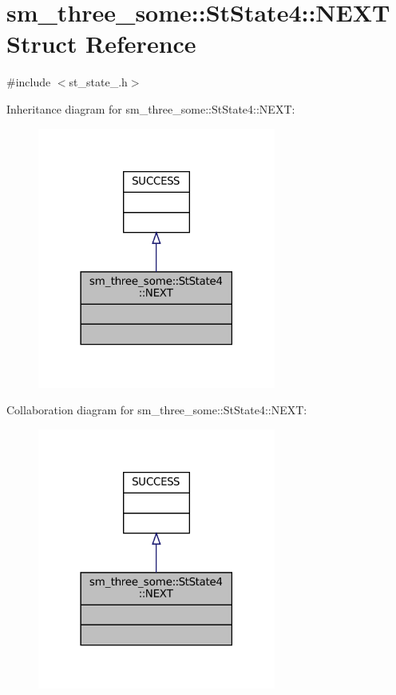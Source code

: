 \hypertarget{structsm__three__some_1_1StState4_1_1NEXT}{}\section{sm\+\_\+three\+\_\+some\+:\+:St\+State4\+:\+:N\+E\+XT Struct Reference}
\label{structsm__three__some_1_1StState4_1_1NEXT}


{\ttfamily \#include $<$st\+\_\+state\+\_.\+h$>$}



Inheritance diagram for sm\+\_\+three\+\_\+some\+:\+:St\+State4\+:\+:N\+E\+XT\+:
\nopagebreak
\begin{figure}[H]
\begin{center}
\leavevmode
\includegraphics[width=222pt]{structsm__three__some_1_1StState4_1_1NEXT__inherit__graph}
\end{center}
\end{figure}


Collaboration diagram for sm\+\_\+three\+\_\+some\+:\+:St\+State4\+:\+:N\+E\+XT\+:
\nopagebreak
\begin{figure}[H]
\begin{center}
\leavevmode
\includegraphics[width=222pt]{structsm__three__some_1_1StState4_1_1NEXT__coll__graph}
\end{center}
\end{figure}


